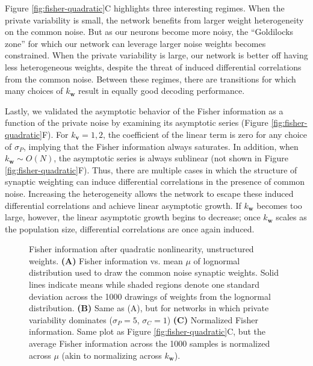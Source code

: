 \documentclass[12pt]{article}
\begin{document}
Figure \ref{fig:fisher-quadratic}C highlights three interesting regimes. When the private variability is small, the network benefits from larger weight heterogeneity on the common noise. But as our neurons become more noisy, the ``Goldilocks zone'' for which our network can leverage larger noise weights becomes constrained. When the private variability is large, our network is better off having less heterogeneous weights, despite the threat of induced differential correlations from the common noise. Between these regimes, there are transitions for which many choices of $k_{\mathbf{w}}$ result in equally good decoding performance.
	
Lastly, we validated the asymptotic behavior of the Fisher information as a function of the private noise by examining its asymptotic series (Figure \ref{fig:fisher-quadratic}F). For $k_{\mathbf{v}}=1,2$, the coefficient of the linear term is zero for any choice of $\sigma_P$, implying that the Fisher information always saturates. In addition, when $k_{\mathbf{w}}\sim O(N)$, the asymptotic series is always sublinear (not shown in Figure \ref{fig:fisher-quadratic}F). Thus, there are multiple cases in which the structure of synaptic weighting can induce differential correlations in the presence of common noise. Increasing the heterogeneity allows the network to escape these induced differential correlations and achieve linear asymptotic growth. If $k_{\mathbf{w}}$ becomes too large, however, the linear asymptotic growth begins to decrease; once $k_{\mathbf{w}}$ scales as the population size, differential correlations are once again induced.
	
\begin{figure}[t]
	\centering
	\caption{Fisher information after quadratic nonlinearity, unstructured weights. \textbf{(A)} Fisher information vs. mean $\mu$ of lognormal distribution used to draw the common noise synaptic weights. Solid lines indicate means while shaded regions denote one standard deviation across the 1000 drawings of weights from the lognormal distribution. \textbf{(B)} Same as (A), but for networks in which private variability dominates ($\sigma_P = 5$, $\sigma_C=1$) \textbf{(C)} Normalized Fisher information. Same plot as Figure \ref{fig:fisher-quadratic}C, but the average Fisher information across the 1000 samples is normalized across $\mu$ (akin to normalizing across $k_{\mathbf{w}}$).} 
	\label{fig:unstructured-quadratic-fisher}
\end{figure}
	
\end{document}

